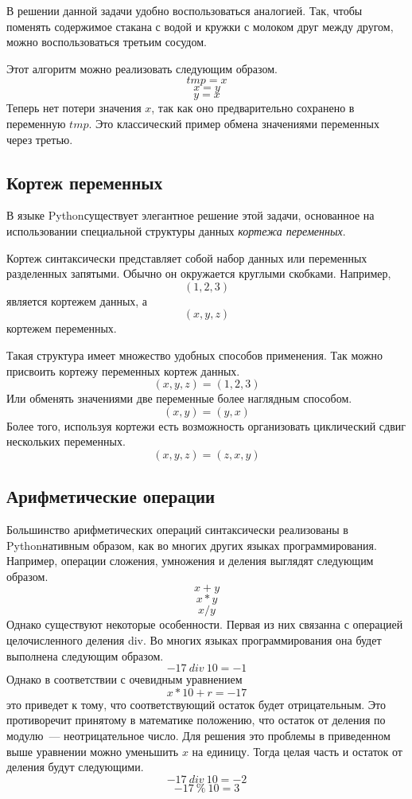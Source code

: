 \documentclass[a4paper, fleqn]{article}
\newcommand*{\py}{Python}
\begin{document}
	В решении данной задачи удобно воспользоваться аналогией. Так, чтобы поменять содержимое стакана с водой и кружки с молоком друг между другом, можно воспользоваться третьим сосудом.
	
	Этот алгоритм можно реализовать следующим образом.
	\[tmp=x\]
	\[x=y\]
	\[y=x\]
	Теперь нет потери значения $x$, так как оно предварительно сохранено в переменную $tmp$. Это классический пример обмена значениями переменных через третью.
	
	\subsection*{Кортеж переменных}
	
	В языке \py существует элегантное решение этой задачи, основанное на использовании специальной структуры данных \emph{кортежа переменных}.
	
	Кортеж синтаксически представляет собой набор данных или переменных разделенных запятыми. Обычно он окружается круглыми скобками. Например,
	\[(1, 2, 3)\]
	является кортежем данных, а
	\[(x, y, z)\]
	кортежем переменных.
	
	Такая структура имеет множество удобных способов применения. Так можно присвоить кортежу переменных кортеж данных.
	\[(x, y, z)=(1, 2, 3)\]
	Или обменять значениями две переменные более наглядным способом.
	\[(x, y) = (y, x)\]
	Более того, используя кортежи есть возможность организовать циклический сдвиг нескольких переменных.
	\[(x, y, z) = (z, x, y)\]
	
	
	\subsection*{Арифметические операции}
	
	Большинство арифметических операций синтаксически реализованы в \py нативным образом, как во многих других языках программирования. Например, операции сложения, умножения и деления выглядят следующим образом.
	\[x+y\]
	\[x*y\]
	\[x/y\]
	Однако существуют некоторые особенности. Первая из них связанна с операцией целочисленного деления div. Во многих языках программирования она будет выполнена следующим образом.
	\[-17~div~10 = -1\]
	Однако в соответствии с очевидным уравнением
	\[x*10+r=-17\]
	это приведет к тому, что соответствующий остаток будет отрицательным. Это противоречит принятому в математике положению, что остаток от деления по модулю~--- неотрицательное число.
	Для решения это проблемы в приведенном выше уравнении можно уменьшить $x$ на единицу. Тогда целая часть и остаток от деления будут следующими.
	\[-17~div~10=-2\]
	\[-17~\%~10 = 3\]
	
\end{document}
